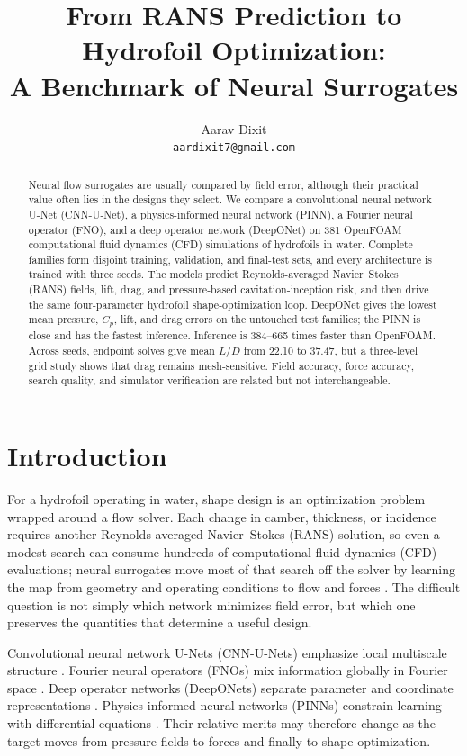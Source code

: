 \documentclass{article}
\title{From RANS Prediction to Hydrofoil Optimization:\\
A Benchmark of Neural Surrogates}
\author{Aarav Dixit\\
\texttt{aardixit7@gmail.com}}
\begin{document}
\maketitle

\begin{abstract}
Neural flow surrogates are usually compared by field error, although their
practical value often lies in the designs they select. We compare a
convolutional neural network U-Net (CNN-U-Net), a physics-informed neural
network (PINN), a Fourier neural operator (FNO), and a deep operator network
(DeepONet) on 381 OpenFOAM computational fluid dynamics (CFD) simulations of
hydrofoils in water. Complete families form disjoint training, validation, and
final-test sets, and every architecture is trained with three seeds. The models
predict Reynolds-averaged Navier--Stokes (RANS) fields, lift, drag, and pressure-based cavitation-inception
risk, and then drive the same four-parameter hydrofoil shape-optimization loop.
DeepONet gives the lowest mean pressure, $C_p$, lift, and drag errors on the
untouched test families; the PINN is close and has the fastest inference.
Inference is 384--665 times faster than OpenFOAM. Across seeds, endpoint solves
give mean $L/D$ from 22.10 to 37.47, but a three-level grid study shows that
drag remains mesh-sensitive. Field accuracy, force accuracy, search quality,
and simulator verification are related but not interchangeable.
\end{abstract}

\section{Introduction}
For a hydrofoil operating in water, shape design is an optimization problem
wrapped around a flow solver. Each change in camber, thickness, or incidence
requires another Reynolds-averaged Navier--Stokes (RANS) solution, so even a modest search can consume hundreds of
computational fluid dynamics (CFD) evaluations; neural surrogates move most of that search off the solver by
learning the map from geometry and operating conditions to flow and forces
\citep{brunton2020machine}. The difficult question is not simply which network
minimizes field error, but which one preserves the quantities that determine a
useful design.

Convolutional neural network U-Nets (CNN-U-Nets) emphasize local multiscale
structure \citep{ronneberger2015unet}. Fourier neural operators (FNOs) mix
information globally in Fourier space \citep{li2021fno,kovachki2023neural}.
Deep operator networks (DeepONets) separate parameter and coordinate
representations \citep{lu2021deeponet}. Physics-informed neural networks
(PINNs) constrain learning with differential equations
\citep{raissi2019pinn}. Their
relative merits may therefore change as the target moves from pressure fields
to forces and finally to shape optimization.
\end{document}
